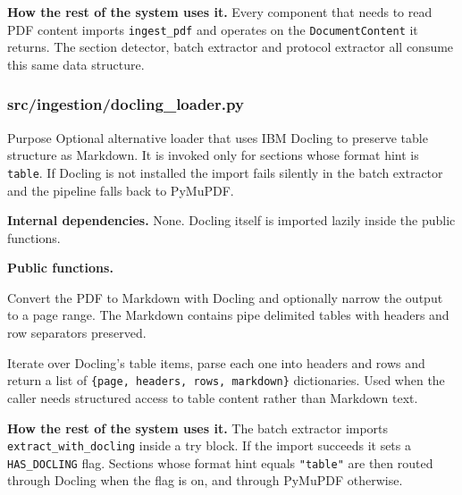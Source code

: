 \documentclass{article}
\begin{document}
\textbf{How the rest of the system uses it.} Every component that
needs to read PDF content imports \texttt{ingest\_pdf} and operates on
the \texttt{DocumentContent} it returns. The section detector, batch
extractor and protocol extractor all consume this same data structure.

\subsubsection{src/ingestion/docling\_loader.py}

\begin{codeconceptbox}{Purpose}
Optional alternative loader that uses IBM Docling to preserve table
structure as Markdown. It is invoked only for sections whose format
hint is \texttt{table}. If Docling is not installed the import fails
silently in the batch extractor and the pipeline falls back to
PyMuPDF.
\end{codeconceptbox}

\textbf{Internal dependencies.} None. Docling itself is imported
lazily inside the public functions.

\textbf{Public functions.}

\begin{description}[leftmargin=2em, style=nextline]
\item[\texttt{extract\_with\_docling(pdf\_path,\allowbreak{} start\_page=None,\allowbreak{} end\_page=None)}]
Convert the PDF to Markdown with Docling and optionally narrow the
output to a page range. The Markdown contains pipe delimited tables
with headers and row separators preserved.
\item[\texttt{extract\_tables\_from\_pages(pdf\_path,\allowbreak{} start\_page,\allowbreak{} end\_page)}]
Iterate over Docling's table items, parse each one into headers and
rows and return a list of \texttt{\{page, headers, rows, markdown\}}
dictionaries. Used when the caller needs structured access to table
content rather than Markdown text.
\end{description}

\textbf{How the rest of the system uses it.} The batch extractor
imports \texttt{extract\_with\_docling} inside a try block. If the
import succeeds it sets a \texttt{HAS\_DOCLING} flag. Sections whose
format hint equals \texttt{"table"} are then routed through Docling
when the flag is on, and through PyMuPDF otherwise.

\end{document}
